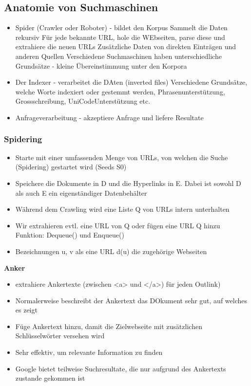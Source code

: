 \documentclass{report}
\theoremstyle{definition}
\theoremstyle{example}
\begin{document}
\subsection{Anatomie von Suchmaschinen}
\begin{itemize}
   \item Spider (Crawler oder Roboter) - bildet den Korpus
   \subitem Sammelt die Daten rekursiv
   \subsubitem Für jede bekannte URL, hole die WEbseiten, parse diese und extrahiere die neuen URLs
   \subitem Zusätzliche Daten von direkten Einträgen und anderen Quellen
   \subitem Verschiedene Suchmaschinen haben unterschiedliche Grundsätze - kleine Übereinstimmung unter den Korpora 
   \item Der Indexer - verarbeitet die DAten (inverted files)
   \subitem Verschiedene Grundsätze, welche Worte indexiert oder gestemmt werden, Phrasenunterstützung, Grossschreibung, UniCodeUnterstützung etc. 
   \item Anfrageverarbeitung - akzeptiere Anfrage und liefere Resultate 
\end{itemize}

\subsubsection{Spidering}
\begin{itemize}
   \item Starte mit einer umfassenden Menge von URLs, von welchen die Suche (Spidering) gestartet wird (Seeds S0)
   \item Speichere die Dokumente in D und die Hyperlinks in E. Dabei ist sowohl D als auch E ein eigenständiger Datenbehälter
   \item Während dem Crawling wird eine Liste Q von URLs intern unterhalten
   \item Wir extrahieren evtl. eine URL von Q oder fügen eine URL Q hinzu
   \subitem Funktion: Dequeue() und Enqueue()
   \item Bezeichnungen
   \subitem u, v als eine URL
   \subitem d(u) die zugehörige Webseiten  
\end{itemize}

\textbf{Anker}
\begin{itemize}
   \item extrahiere Ankertexte (zwischen <a> und </a>) für jeden Outlink)
   \item Normalerweise beschreibt der Ankertext das DOkument sehr gut, auf welches es zeigt
   \item Füge Ankertext hinzu, damit die Zielwebseite mit zusätzlichen Schlüsselwörter versehen wird
   \item Sehr effektiv, um relevante Information zu finden
   \item Google bietet teilweise Suchresultate, die nur aufgrund des Ankertexts zustande gekommen ist
\end{itemize}
\end{document}
